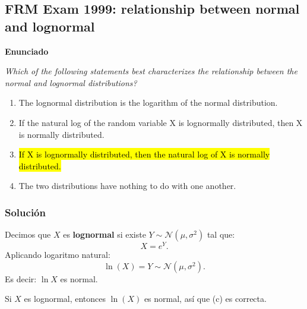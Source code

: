 ﻿\subsection{FRM Exam 1999: relationship between normal and lognormal}

\textbf{Enunciado}

\emph{Which of the following statements best characterizes the relationship between the normal and lognormal distributions?}
\begin{enumerate}[label=\alph*.]
\item The lognormal distribution is the logarithm of the normal distribution.
\item If the natural log of the random variable X is lognormally distributed, then X is normally distributed.
\item \hl{If X is lognormally distributed, then the natural log of X is normally distributed.} 
\item The two distributions have nothing to do with one another.
\end{enumerate}

\subsubsection*{Solución}


Decimos que \(X\) es \textbf{lognormal} si existe \(Y\sim\mathcal N(\mu,\sigma^2)\) tal que:
\[
X=e^{Y}.
\]
Aplicando logaritmo natural:
\[
\ln(X)=Y\sim\mathcal N(\mu,\sigma^2).
\]
Es decir: \(\ln X\) es normal.


Si \(X\) es lognormal, entonces \(\ln(X)\) es normal, así que (c) es correcta.












